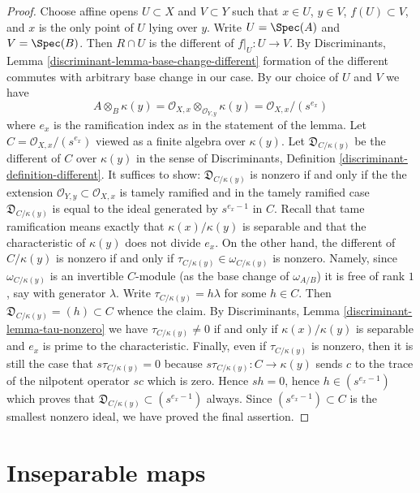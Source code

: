 \begin{proof}
\medskip\noindent
Choose affine opens $U \subset X$ and $V \subset Y$
such that $x \in U$, $y \in V$, $f(U) \subset V$, and $x$ is the only
point of $U$ lying over $y$. Write $U = \Spec(A)$ and $V = \Spec(B)$.
Then $R \cap U$ is the different of $f|_U : U \to V$.
By Discriminants, Lemma \ref{discriminant-lemma-base-change-different}
formation of the different commutes with arbitrary base change
in our case. By our choice of $U$ and $V$ we have
$$
A \otimes_B \kappa(y) =
\mathcal{O}_{X, x} \otimes_{\mathcal{O}_{Y, y}} \kappa(y) =
\mathcal{O}_{X, x}/(s^{e_x})
$$
where $e_x$ is the ramification index as in the statement of the lemma.
Let $C = \mathcal{O}_{X, x}/(s^{e_x})$ viewed as a finite algebra
over $\kappa(y)$. Let $\mathfrak{D}_{C/\kappa(y)}$ be the different
of $C$ over $\kappa(y)$ in the sense of
Discriminants, Definition \ref{discriminant-definition-different}.
It suffices to show: $\mathfrak{D}_{C/\kappa(y)}$
is nonzero if and only if the the extension
$\mathcal{O}_{Y, y} \subset \mathcal{O}_{X, x}$ is tamely ramified
and in the tamely ramified case $\mathfrak{D}_{C/\kappa(y)}$
is equal to the ideal generated by $s^{e_x - 1}$ in $C$.
Recall that tame ramification means exactly that $\kappa(x)/\kappa(y)$
is separable and that the characteristic of $\kappa(y)$ does not
divide $e_x$. On the other hand, the different of $C/\kappa(y)$ is nonzero
if and only if $\tau_{C/\kappa(y)} \in \omega_{C/\kappa(y)}$ is nonzero.
Namely, since $\omega_{C/\kappa(y)}$ is an invertible $C$-module
(as the base change of $\omega_{A/B}$)
it is free of rank $1$, say with generator $\lambda$. Write
$\tau_{C/\kappa(y)} = h\lambda$ for some $h \in C$. Then
$\mathfrak{D}_{C/\kappa(y)} = (h) \subset C$ whence the claim.
By Discriminants, Lemma \ref{discriminant-lemma-tau-nonzero}
we have $\tau_{C/\kappa(y)} \not = 0$
if and only if $\kappa(x)/\kappa(y)$
is separable and $e_x$ is prime to the characteristic.
Finally, even if $\tau_{C/\kappa(y)}$ is nonzero, then
it is still the case that $s \tau_{C/\kappa(y)} = 0$
because $s\tau_{C/\kappa(y)} : C \to \kappa(y)$
sends $c$ to the trace of the nilpotent operator $sc$ which is zero.
Hence $sh = 0$, hence $h \in (s^{e_x - 1})$ which proves
that $\mathfrak{D}_{C/\kappa(y)} \subset (s^{e_x - 1})$ always.
Since $(s^{e_x - 1}) \subset C$ is the smallest nonzero ideal,
we have proved the final assertion.
\end{proof}






\section{Inseparable maps}
\label{section-inseparable}

